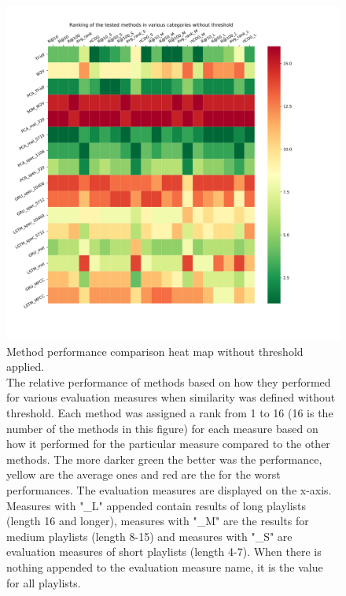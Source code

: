 \begin{figure}[h]
    \centering
	\includegraphics[width=1\linewidth]{./img/no_threshold_method_ranking.png}
	\caption[Method performance comparison heat map without threshold applied]{Method performance comparison heat map without threshold applied. \\ The relative performance of methods based on how they performed for various evaluation measures when similarity was defined without threshold. Each method was assigned a rank from 1 to 16 (16 is the number of the methods in this figure) for each measure based on how it performed for the particular measure compared to the other methods. The more darker green the better was the performance, yellow are the average ones and red are the for the worst performances. The evaluation measures are displayed on the x-axis. Measures with "\_L" appended contain results of long playlists (length 16 and longer), measures with "\_M" are the results for medium playlists (length 8-15) and measures with "\_S" are evaluation measures of short playlists (length 4-7). When there is nothing appended to the evaluation measure name, it is the value for all playlists.}
	\label{fig:no_threshold_method_comparison}
\end{figure}
